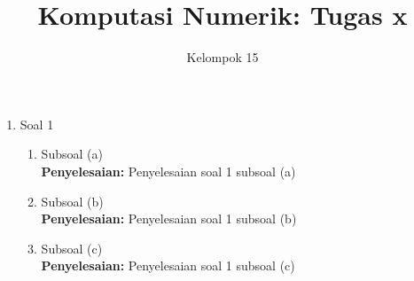 \documentclass{article}
\title{\textbf{Komputasi Numerik: Tugas x}}
\author{Kelompok 15}
\date{}
\newcommand{\penyelesaian}{\textbf{Penyelesaian: }}
\begin{document}
\maketitle

\begin{enumerate}
    \item Soal 1
    \begin{enumerate}
        \item Subsoal (a) \\
        \penyelesaian Penyelesaian soal 1 subsoal (a)

        \item Subsoal (b) \\
        \penyelesaian Penyelesaian soal 1 subsoal (b)

        \item Subsoal (c) \\
        \penyelesaian  Penyelesaian soal 1 subsoal (c)
    \end{enumerate}


\end{enumerate}
\end{document}
